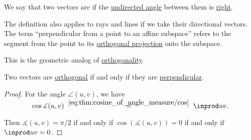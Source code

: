 \begin{definition}\label{def:perpendicularity}\mimprovised
  We say that two vectors are  if the \hyperref[def:angle/undirected]{undirected angle} between them is \hyperref[def:angle/measure/right]{right}.

  \begin{thmenum}
     The definition also applies to rays and lines if we take their directional vectors.
     The term \enquote{perpendicular from a point to an affine subspace} refers to the segment from the point to its \hyperref[def:orthogonal_projection]{orthogonal projection} onto the subspace.
  \end{thmenum}
\end{definition}
\begin{comments}
  \item This is the geometric analog of \hyperref[def:orthogonality]{orthogonality}.
\end{comments}

\begin{proposition}\label{thm:perpendicular_iff_orthogonal}
  Two vectors are \hyperref[def:orthogonality]{orthogonal} if and only if they are \hyperref[def:perpendicularity/directional]{perpendicular}.
\end{proposition}
\begin{proof}
  For the angle \( \angle(u, v) \), we have
  \begin{equation*}
    \cos \measuredangle(u, v)
    \reloset {\eqref{eq:thm:cosine_of_angle_measure/cos}} =
    \inprod u v.
  \end{equation*}

  Then \( \measuredangle(u, v) = \pi / 2 \) if and only if \( \cos(\measuredangle(u, v)) = 0 \) if and only if \( \inprod u v = 0 \).
\end{proof}

